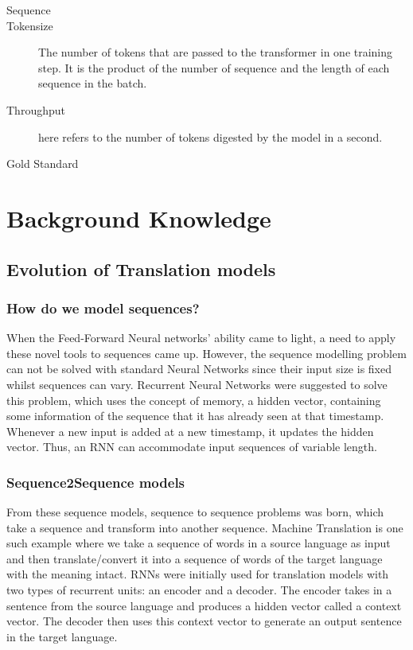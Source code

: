 \documentclass[12pt,a4paper,twoside,openright]{report}
\begin{document}
\begin{description}
    \item[Sequence] 
    \item[Tokensize] The number of tokens that are passed to the transformer in one training step. It is the product of the number of sequence and the length of each sequence in the batch. 
    \item[Throughput] here refers to the number of tokens digested by the model in a second.
    \item[Gold Standard]
\end{description}



\section{Background Knowledge}
\label{background}

\subsection{Evolution of Translation models}
\label{evolution}

\subsubsection{How do we model sequences?}
When the Feed-Forward Neural networks' ability came to light, a need to apply these novel tools to sequences came up. However, the sequence modelling problem can not be solved with standard Neural Networks since their input size is fixed whilst sequences can vary. Recurrent Neural Networks were suggested to solve this problem, which uses the concept of memory, a hidden vector, containing some information of the sequence that it has already seen at that timestamp. Whenever a new input is added at a new timestamp, it updates the hidden vector. Thus, an RNN can accommodate input sequences of variable length. 

\subsubsection{Sequence2Sequence models}
From these sequence models, sequence to sequence problems was born, which take a sequence and transform into another sequence. Machine Translation is one such example where we take a sequence of words in a source language as input and then translate/convert it into a sequence of words of the target language with the meaning intact. RNNs were initially used for translation models with two types of recurrent units: an encoder and a decoder. The encoder takes in a sentence from the source language and produces a hidden vector called a context vector. The decoder then uses this context vector to generate an output sentence in the target language. 
\end{document}
